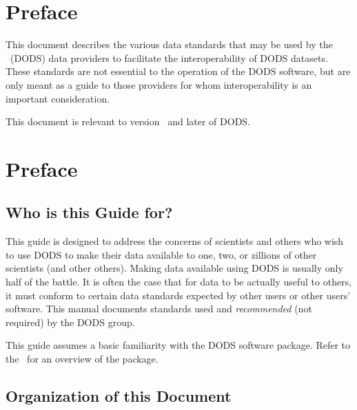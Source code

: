 %
%
%
%
%

\T\chapter*{Preface}
\T{}

This document describes the various data standards that may be used by
the \DODS\ (DODS) data providers to facilitate the interoperability of
DODS datasets.  These standards are not essential to the operation of
the DODS software, but are only meant as a guide to those providers
for whom interoperability is an important consideration.

This document is relevant to version \DODSversion\ and later of DODS.

\W{}
\W\chapter*{Preface}


\section{Who is this Guide for?}
\label{pref,who}

This guide is designed to address the concerns of scientists and
others who wish to use DODS to make their data available to one, two,
or zillions of other scientists (and other others).  Making data
available using DODS is usually only half of the battle.  It is often
the case that for data to be actually useful to others, it must
conform to certain data standards expected by other users or other
users' software.  This manual documents standards used and
\emph{recommended} (not required) by the DODS group.

This guide assumes a basic familiarity with the DODS software
package.  Refer to the \DODSuser\ for an overview of the package.


\section{Organization of this Document}

